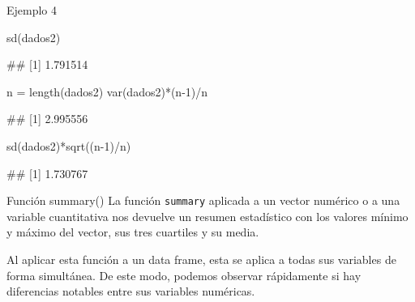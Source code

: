 \documentclass[
  ignorenonframetext,
  aspectratio=169]{beamer}
\newenvironment{Shaded}{\begin{snugshade}}{\end{snugshade}}
\newcommand{\DecValTok}[1]{\textcolor[rgb]{0.00,0.00,0.81}{#1}}
\newcommand{\FunctionTok}[1]{\textcolor[rgb]{0.00,0.00,0.00}{#1}}
\newcommand{\NormalTok}[1]{#1}
\newcommand{\OtherTok}[1]{\textcolor[rgb]{0.56,0.35,0.01}{#1}}
\newcommand{\SpecialCharTok}[1]{\textcolor[rgb]{0.00,0.00,0.00}{#1}}
\let\oldverbatim\verbatim
\let\endoldverbatim\endverbatim
\renewenvironment{verbatim}{\tiny\oldverbatim}{\endoldverbatim}
\begin{document}
\begin{frame}[fragile]{Ejemplo 4}
\protect\hypertarget{ejemplo-4-1}{}
\begin{Shaded}
\begin{Highlighting}[]
\FunctionTok{sd}\NormalTok{(dados2)}
\end{Highlighting}
\end{Shaded}

\begin{verbatim}
## [1] 1.791514
\end{verbatim}

\begin{Shaded}
\begin{Highlighting}[]
\NormalTok{n }\OtherTok{=} \FunctionTok{length}\NormalTok{(dados2)}
\FunctionTok{var}\NormalTok{(dados2)}\SpecialCharTok{*}\NormalTok{(n}\DecValTok{{-}1}\NormalTok{)}\SpecialCharTok{/}\NormalTok{n}
\end{Highlighting}
\end{Shaded}

\begin{verbatim}
## [1] 2.995556
\end{verbatim}

\begin{Shaded}
\begin{Highlighting}[]
\FunctionTok{sd}\NormalTok{(dados2)}\SpecialCharTok{*}\FunctionTok{sqrt}\NormalTok{((n}\DecValTok{{-}1}\NormalTok{)}\SpecialCharTok{/}\NormalTok{n)}
\end{Highlighting}
\end{Shaded}

\begin{verbatim}
## [1] 1.730767
\end{verbatim}
\end{frame}

\begin{frame}[fragile]{Función summary()}
\protect\hypertarget{funciuxf3n-summary}{}
La función \texttt{summary} aplicada a un vector numérico o a una
variable cuantitativa nos devuelve un resumen estadístico con los
valores mínimo y máximo del vector, sus tres cuartiles y su media.

Al aplicar esta función a un data frame, esta se aplica a todas sus
variables de forma simultánea. De este modo, podemos observar
rápidamente si hay diferencias notables entre sus variables numéricas.
\end{frame}
\end{document}
